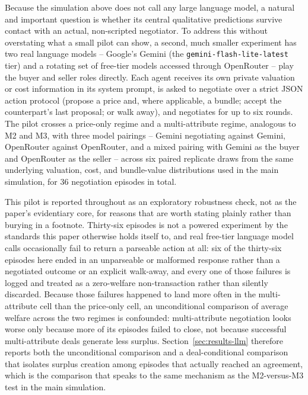 \documentclass[review]{elsarticle}
\begin{document}
Because the simulation above does not call any large language model, a natural and important question is whether its central qualitative predictions survive contact with an actual, non-scripted negotiator. To address this without overstating what a small pilot can show, a second, much smaller experiment has two real language models -- Google's Gemini (the \texttt{gemini-flash-lite-latest} tier) and a rotating set of free-tier models accessed through OpenRouter -- play the buyer and seller roles directly. Each agent receives its own private valuation or cost information in its system prompt, is asked to negotiate over a strict JSON action protocol (propose a price and, where applicable, a bundle; accept the counterpart's last proposal; or walk away), and negotiates for up to six rounds. The pilot crosses a price-only regime and a multi-attribute regime, analogous to M2 and M3, with three model pairings -- Gemini negotiating against Gemini, OpenRouter against OpenRouter, and a mixed pairing with Gemini as the buyer and OpenRouter as the seller -- across six paired replicate draws from the same underlying valuation, cost, and bundle-value distributions used in the main simulation, for 36 negotiation episodes in total.

This pilot is reported throughout as an exploratory robustness check, not as the paper's evidentiary core, for reasons that are worth stating plainly rather than burying in a footnote. Thirty-six episodes is not a powered experiment by the standards this paper otherwise holds itself to, and real free-tier language model calls occasionally fail to return a parseable action at all: six of the thirty-six episodes here ended in an unparseable or malformed response rather than a negotiated outcome or an explicit walk-away, and every one of those failures is logged and treated as a zero-welfare non-transaction rather than silently discarded. Because those failures happened to land more often in the multi-attribute cell than the price-only cell, an unconditional comparison of average welfare across the two regimes is confounded: multi-attribute negotiation looks worse only because more of its episodes failed to close, not because successful multi-attribute deals generate less surplus. Section~\ref{sec:results-llm} therefore reports both the unconditional comparison and a deal-conditional comparison that isolates surplus creation among episodes that actually reached an agreement, which is the comparison that speaks to the same mechanism as the M2-versus-M3 test in the main simulation.
\end{document}
